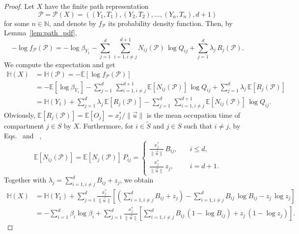 \documentclass[smallextended]{svjour3}
\makeatletter
\renewcommand*{\eqref}[1]{%
  \hyperref[{#1}]{\textup{\tagform@{\ref*{#1}}}}%
}
\newcommand{\N}{\mathbb{N}}
\newcommand{\E}{\mathbb{E}}
\renewcommand{\H}{\mathbb{H}}
\newcommand{\suml}{\sum\limits}
\newcommand{\vnorms}[1]{\|#1\|}
\newcommand{\pdf}{probability density function}
\makeatother
\begin{document}
\begin{proof}
	Let $X$ have the finite path representation 
	\begin{equation*}
		\mathcal{P}=\mathcal{P}(X)=((Y_1,T_1),(Y_2,T_2),\ldots,(Y_n,T_n),d+1)
	\end{equation*}
	for some $n\in\N$, and denote by $f_{\mathcal{P}}$ its \pdf.
	Then, by Lemma~\ref{lem:path_pdf},
	\begin{equation*}
		-\log f_{\mathcal{P}}(\mathcal{P}) = -\log\beta_{Y_1} - \suml_{j=1}^d\,\suml_{i=1,i\neq j}^{d+1}N_{ij}(\mathcal{P})\,\log Q_{ij} + \suml_{j=1}^d \lambda_j\,R_j(\mathcal{P}).
	\end{equation*}
	We compute the expectation and get
	\begin{align*}
		\H(X) &= \H(\mathcal{P}) = -\E\left[\log f_{\mathcal{P}}(\mathcal{P})\right]\\
		&= -\E\left[\log\beta_{Y_1}\right] - \suml_{j=1}^d\,\suml_{i=1,i\neq j}^{d+1}\E\left[N_{ij}(\mathcal{P})\right]\,\log Q_{ij} + \suml_{j=1}^d \lambda_j\,\E\left[R_j(\mathcal{P})\right]\\
		&= \H(Y_1) + \suml_{j=1}^d \lambda_j\,\E\left[R_j(\mathcal{P})\right] - \suml_{j=1}^d\,\suml_{i=1,i\neq j}^{d+1}\E\left[N_{ij}(\mathcal{P})\right]\,\log Q_{ij}.
	\end{align*}
	Obviously, $\E\left[R_j(\mathcal{P})\right]=\E\left[O_j\right]=x^\ast_j/\vnorms{\vec{u}}$ is the mean occupation time of compartment $j\in S$ by $X$.
	Furthermore, for $i\in\widetilde{S}$ and $j\in S$ such that $i\neq j$, by Eqs.~\eqref{eqn:N_i} and~\eqref{eqn:P_ij},
	\begin{equation*}
		\E\left[N_{ij}(\mathcal{P})\right] = \E\left[N_j(\mathcal{P})\right]\,P_{ij} = 
		\begin{cases}
			\frac{x^\ast_j}{\vnorms{\vec{u}}}\,B_{ij},\quad & i\leq d,\\
			\frac{x^\ast_j}{\vnorms{\vec{u}}}\,z_j,&i=d+1.
		\end{cases}
	\end{equation*}
	Together with $\lambda_j=\sum_{i=1,i\neq j}^{d} B_{ij}+z_j$, we obtain
	\begin{align*}
		\H(X) &= \H(Y_1) + \suml_{j=1}^d \frac{x^\ast_j}{\vnorms{\vec{u}}}\left[\left(\suml_{i=1,i\neq j}^d B_{ij}+z_j\right) - \suml_{i=1,i\neq j}^d B_{ij}\,\log B_{ij} - z_j\,\log z_j\right]\\
		&= -\suml_{i=1}^d \beta_i\log\beta_i + \suml_{j=1}^d \frac{x^\ast_j}{\vnorms{\vec{u}}} \left[\suml_{i=1,i\neq j}^d B_{ij}\,(1-\log B_{ij}) + z_j\,(1-\log z_j)\right].
	\end{align*}
\end{proof}
\end{document}
